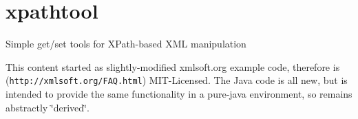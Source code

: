 \section*{xpathtool }

Simple get/set tools for X\-Path-\/based X\-M\-L manipulation

This content started as slightly-\/modified xmlsoft.\-org example code, therefore is ({\tt http\-://xmlsoft.\-org/\-F\-A\-Q.\-html}) M\-I\-T-\/\-Licensed. The Java code is all new, but is intended to provide the same functionality in a pure-\/java environment, so remains abstractly \char`\"{}derived\char`\"{}. 